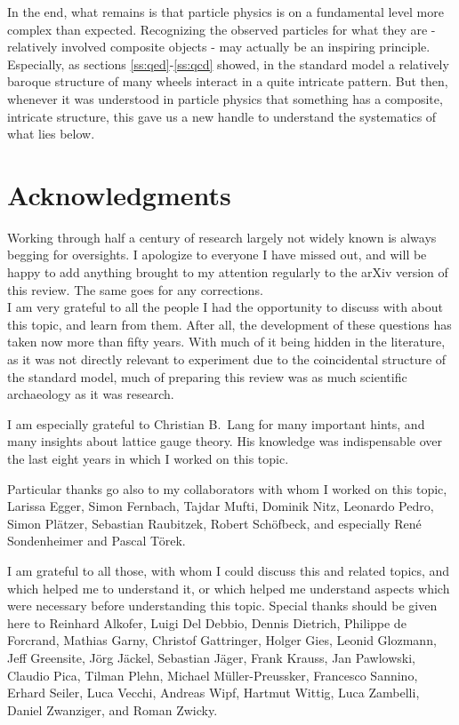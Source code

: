 \documentclass[final,12pt]{article}
\newcommand*{\1}{1\!\!\!\bot}
\begin{document}
In the end, what remains is that particle physics is on a fundamental level more complex than expected. Recognizing the observed particles for what they are - relatively involved composite objects - may actually be an inspiring principle. Especially, as sections \ref{ss:qed}-\ref{ss:qcd} showed, in the standard model a relatively baroque structure of many wheels interact in a quite intricate pattern. But then, whenever it was understood in particle physics that something has a composite, intricate structure, this gave us a new handle to understand the systematics of what lies below.

\section*{Acknowledgments}

Working through half a century of research largely not widely known is always begging for oversights. I apologize to everyone I have missed out, and will be happy to add anything brought to my attention regularly to the arXiv version of this review. The same goes for any corrections.\\

I am very grateful to all the people I had the opportunity to discuss with about this topic, and learn from them. After all, the development of these questions has taken now more than fifty years. With much of it being hidden in the literature, as it was not directly relevant to experiment due to the coincidental structure of the standard model, much of preparing this review was as much scientific archaeology as it was research.

I am especially grateful to Christian B.\ Lang for many important hints, and many insights about lattice gauge theory. His knowledge was indispensable over the last eight years in which I worked on this topic.

Particular thanks go also to my collaborators with whom I worked on this topic, Larissa Egger, Simon Fernbach, Tajdar Mufti, Dominik Nitz, Leonardo Pedro, Simon Pl\"atzer, Sebastian Raubitzek, Robert Sch\"ofbeck, and especially Ren\'e Sondenheimer and Pascal T\"orek.

I am grateful to all those, with whom I could discuss this and related topics, and which helped me to understand it, or which helped me understand aspects which were necessary before understanding this topic. Special thanks should be given here to Reinhard Alkofer, Luigi Del Debbio, Dennis Dietrich, Philippe de Forcrand, Mathias Garny, Christof Gattringer, Holger Gies, Leonid Glozmann, Jeff Greensite, J\"org J\"ackel, Sebastian J\"ager, Frank Krauss, Jan Pawlowski, Claudio Pica, Tilman Plehn, Michael M\"uller-Preussker, Francesco Sannino, Erhard Seiler, Luca Vecchi, Andreas Wipf, Hartmut Wittig, Luca Zambelli, Daniel Zwanziger, and Roman Zwicky.
\end{document}
